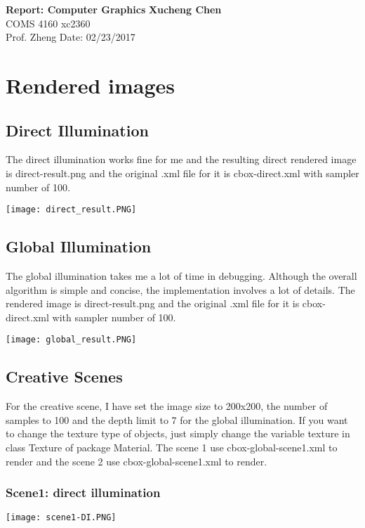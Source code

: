 \documentclass[a4paper, 11pt]{article}
\begin{document}
\noindent
\large\textbf{Report: Computer Graphics} \hfill \textbf{Xucheng Chen} \\
\normalsize COMS 4160 \hfill xc2360 \\
Prof. Zheng \hfill Date: 02/23/2017

\section*{Rendered images}
    \subsection{Direct Illumination}
        \indent The direct illumination works fine for me and the resulting direct rendered image is direct-result.png and the original .xml file for it is cbox-direct.xml with sampler number of 100.
        \begin{center}
        \texttt{[image: direct\_result.PNG]}
        \end{center}
    \subsection{Global Illumination}
        \indent The global illumination takes me a lot of time in debugging. Although the overall algorithm is simple and concise, the implementation involves a lot of details. The rendered image is direct-result.png and the original .xml file for it is cbox-direct.xml with sampler number of 100.
        \begin{center}
        \texttt{[image: global\_result.PNG]}
        \end{center}
    \subsection{Creative Scenes}
        For the creative scene, I have set the image size to 200x200, the number of samples to 100 and the depth limit to 7 for the global illumination. If you want to change the texture type of objects, just simply change the variable texture in class Texture of package Material. The scene 1 use cbox-global-scene1.xml to render and the scene 2 use cbox-global-scene1.xml to render.
        \subsubsection{Scene1: direct illumination}
            \begin{center}
                \texttt{[image: scene1-DI.PNG]}
            \end{center}
\end{document}
